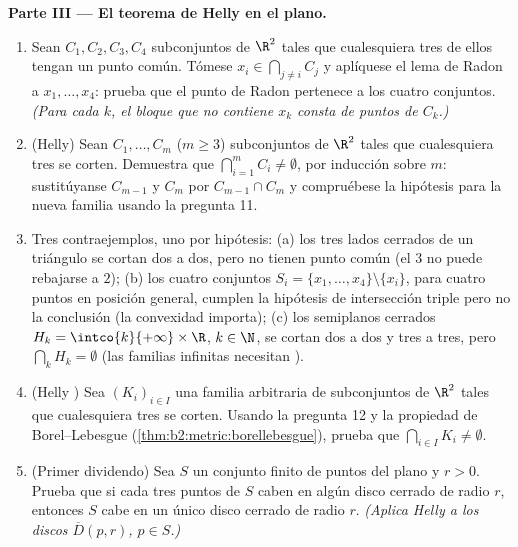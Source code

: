\begin{problem}
\medskip
\noindent\textbf{Parte III --- El teorema de Helly en el plano.}
\begin{enumerate}[resume]
  \item Sean $C_1, C_2, C_3, C_4$ subconjuntos  de $\R^2$
        tales que cualesquiera tres de ellos tengan un punto común.
        Tómese $x_i \in \bigcap_{j \neq i} C_j$ y aplíquese el lema
        de Radon a $x_1, \dots, x_4$: prueba que el punto de Radon
        pertenece a los cuatro conjuntos. \emph{(Para cada $k$, el
        bloque que no contiene $x_k$ consta de puntos de $C_k$.)}
  \item (Helly) Sean $C_1, \dots, C_m$ ($m \geq 3$) subconjuntos
         de $\R^2$ tales que cualesquiera tres se corten.
        Demuestra que $\bigcap_{i=1}^m C_i \neq \emptyset$, por
        inducción sobre $m$: sustitúyanse $C_{m-1}$ y $C_m$ por
        $C_{m-1} \cap C_m$ y compruébese la hipótesis para la nueva
        familia usando la pregunta 11.
  \item Tres contraejemplos, uno por hipótesis: (a) los tres lados
        cerrados de un triángulo se cortan dos a dos, pero no tienen
        punto común (el $3$ no puede rebajarse a $2$); (b) los cuatro
        conjuntos $S_i = \{x_1, \dots, x_4\} \setminus \{x_i\}$,
        para cuatro puntos en posición general, cumplen la hipótesis
        de intersección triple pero no la conclusión (la convexidad
        importa); (c) los semiplanos cerrados $H_k =
        \intco{k}{+\infty} \times \R$, $k \in \N$, se cortan dos a
        dos y tres a tres, pero $\bigcap_k H_k = \emptyset$ (las
        familias infinitas necesitan ).
  \item (Helly ) Sea $(K_i)_{i \in I}$ una familia
        arbitraria de subconjuntos   de $\R^2$
        tales que cualesquiera tres se corten. Usando la pregunta 12
        y la propiedad de Borel--Lebesgue
        (\cref{thm:b2:metric:borellebesgue}), prueba que $\bigcap_{i
        \in I} K_i \neq \emptyset$.
  \item (Primer dividendo) Sea $S$ un conjunto finito de puntos del
        plano y $r > 0$. Prueba que si cada tres puntos de $S$ caben
        en algún disco cerrado de radio $r$, entonces $S$ cabe en un
        único disco cerrado de radio $r$. \emph{(Aplica Helly a los
        discos $\overline D(p, r)$, $p \in S$.)}
\end{enumerate}


\end{problem}
